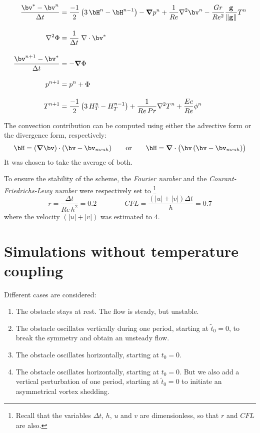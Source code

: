 \documentclass[11 pt]{article}
\begin{document}
\begin{align}
    \frac{\bv^* - \bv^n}{\Delta t} &= \frac{-1}{2} \left(3\,\bH^n - \bH^{n-1}\right) - \boldsymbol{\nabla} p^n + \frac{1}{Re} \nabla^2 \bv^n - \frac{Gr}{Re^2} \frac{\mathbf{g}}{\left\|\mathbf{g}\right\|} T^n \label{eq:predictor} \\[10pt]
    \nabla^2\Phi &= \frac{1}{\Delta t} \; \nabla \cdot \bv^*\\[10pt]
    \frac{\bv^{n+1} - \bv^*}{\Delta t} &= -\boldsymbol{\nabla} \Phi\\[10pt]
    p^{n+1} &= p^n + \Phi\\[10pt]
    T^{n+1} &= \frac{-1}{2} \left(3\, H_T^n - H_T^{n-1}\right) + \frac{1}{Re\, Pr} \nabla^2 T^n + \frac{Ec}{Re} \phi^n \label{eq:corrector}
\end{align}

The convection contribution can be computed using either the advective form or the divergence form, respectively:
\begin{equation}
    \bH = (\boldsymbol\nabla \bv) \cdot (\bv - \bv_{mesh}) \qquad \text{or} \qquad \bH = \boldsymbol\nabla \cdot \big(\bv \, (\bv - \bv_{mesh}) \big)
\end{equation}
It was chosen to take the average of both.

To ensure the stability of the scheme, the \textit{Fourier number} and the \textit{Courant-Friedrichs-Lewy number} were respectively set to \footnote{Recall that the variables $\Delta t$, $h$, $u$ and $v$ are dimensionless, so that $r$ and $CFL$ are also.}
\begin{equation}
    r = \frac{\Delta t}{Re \, h^2} = 0.2 \qquad\qquad CFL = \frac{(|u|+|v|) \Delta t}{h} = 0.7
\end{equation}
where the velocity $(|u|+|v|)$ was estimated to $4$.


\section{Simulations without temperature coupling}
Different cases are considered:
\begin{enumerate}[topsep=0pt]
    \setlength\itemsep{0pt}
    \item The obstacle stays at rest. The flow is steady, but unstable.
    \item The obstacle oscillates vertically during one period, starting at $\tilde t_0 = 0$, to break the symmetry and obtain an unsteady flow.
    \item The obstacle oscillates horizontally, starting at $t_0=0$.
    \item The obstacle oscillates horizontally, starting at $t_0=0$. But we also add a vertical perturbation of one period, starting at $\tilde t_0=0$ to initiate an asymmetrical vortex shedding.
\end{enumerate}
\end{document}
